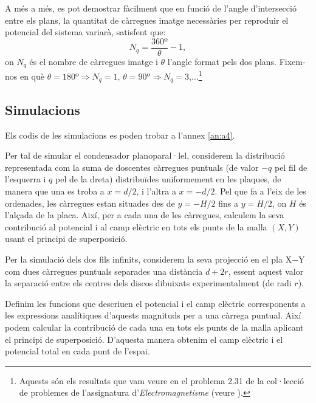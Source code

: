 \documentclass[a4paper,10.5pt]{report}
\begin{document}
A més a més, es pot demostrar fàcilment que en funció de l'angle d'intersecció entre els plans, la quantitat de càrregues imatge necessàries per reproduir el potencial del sistema variarà, satisfent que:
\begin{equation}
	N_q = \frac{360\text{º}}{\theta}-1 \label{eqimatges},
\end{equation}
on $N_q$ és el nombre de càrregues imatge i $\theta$ l'angle format pels dos plans. Fixem-nos en què $\theta = 180\text{º} \Rightarrow N_q = 1$, $\theta=90\text{º}\Rightarrow N_q =3$,$\dots$\footnote{Aquests són els resultats que vam veure en el problema 2.31 de la col·lecció de problemes de l'assignatura d'\textit{Electromagnetisme} (veure \cite{ref1}).} 
\subsection{Simulacions}
Els codis de les simulacions es poden trobar a l'annex \ref{an:a4}.

Per tal de simular el condensador planoparal·lel, considerem la distribució representada com la suma de doscentes càrregues puntuals (de valor $-q$ pel fil de l'esquerra i $q$ pel de la dreta) distribuïdes uniformement en les plaques, de manera que una es troba a $x = d/2$, i l'altra a $x = - d/2$. Pel que fa a l'eix de les ordenades, les càrregues estan situades des de $y = -H/2$ fins a $y = H/2$, on $H$ és l'alçada de la placa. Així, per a cada una de les càrregues, calculem la seva contribució al potencial i al camp elèctric en tots els punts de la malla $(X, Y)$ usant el principi de superposició.

Per la simulació dels dos fils infinits, considerem la seva projecció en el pla X$-$Y com dues càrregues puntuals separades una distància $d+2r$, essent aquest valor la separació entre els centres dels discos dibuixats experimentalment (de radi $r$).

Definim les funcions que descriuen el potencial i el camp elèctric corresponents a les expressions analítiques d'aquests magnituds per a una càrrega puntual. Així podem calcular la contribució de cada una en tots els punts de la malla aplicant el principi de superposició. D'aquesta manera obtenim el camp elèctric i el potencial total en cada punt de l’espai.
\end{document}
